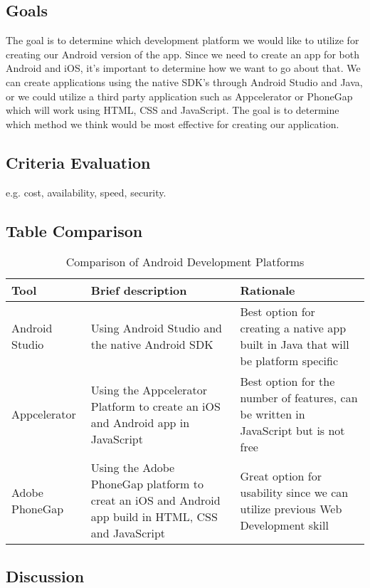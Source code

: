 \documentclass[letterpaper,10pt,draftclsnofoot,onecolumn,titlepage]{IEEEtran}
\begin{document}
		\subsection{Goals}
			The goal is to determine which development platform we would like to utilize for creating our Android version of the app.
			Since we need to create an app for both Android and iOS, it's important to determine how we want to go about that.
			We can create applications using the native SDK's through Android Studio and Java, or we could utilize a third party application such as Appcelerator or PhoneGap which will work using HTML, CSS and JavaScript.
			The goal is to determine which method we think would be most effective for creating our application.

		\subsection{Criteria Evaluation}
		e.g. cost, availability, speed, security.
		\subsection{Table Comparison}
		\begin{table}[ht]
			\caption{Comparison of Android Development Platforms}
			\begin{center}
				\begin{tabular} { | m{3cm} | m{5cm} | m{5cm} | }
					\hline\hline
					Tool & Brief description & Rationale \\ [0.5ex]
					\hline
					Android Studio & Using Android Studio and the native Android SDK & Best option for creating a native app built in Java that will be platform specific \\
					\hline
					Appcelerator & Using the Appcelerator Platform to create an iOS and Android app in JavaScript & Best option for the number of features, can be written in JavaScript but is not free\\
					\hline
					Adobe PhoneGap & Using the Adobe PhoneGap platform to creat an iOS and Android app build in HTML, CSS and JavaScript & Great option for usability since we can utilize previous Web Development skill \\
					\hline
				\end{tabular}
			\end{center}
		\end{table}
		\subsection{Discussion}
\end{document}
